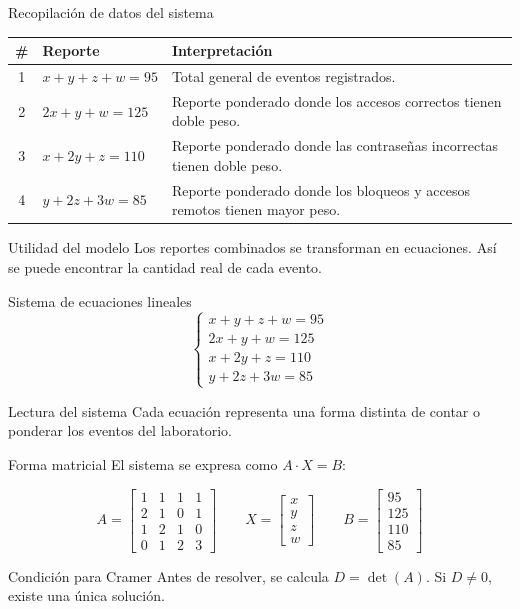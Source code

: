 \documentclass[aspectratio=169]{beamer}
\newcommand{\mat}[1]{\begin{bmatrix}#1\end{bmatrix}}
\begin{document}
\begin{frame}{Recopilación de datos del sistema}
\begin{table}
\centering
\scriptsize
\begin{tabular}{clp{8.7cm}}
\toprule
\# & Reporte & Interpretación \\
\midrule
1 & $x+y+z+w=95$ & Total general de eventos registrados. \\
2 & $2x+y+w=125$ & Reporte ponderado donde los accesos correctos tienen doble peso. \\
3 & $x+2y+z=110$ & Reporte ponderado donde las contraseñas incorrectas tienen doble peso. \\
4 & $y+2z+3w=85$ & Reporte ponderado donde los bloqueos y accesos remotos tienen mayor peso. \\
\bottomrule
\end{tabular}
\end{table}

\begin{block}{Utilidad del modelo}
Los reportes combinados se transforman en ecuaciones. Así se puede encontrar la cantidad real de cada evento.
\end{block}
\end{frame}

\begin{frame}{Sistema de ecuaciones lineales}
\[
\begin{cases}
x+y+z+w=95 \\
2x+y+w=125 \\
x+2y+z=110 \\
y+2z+3w=85
\end{cases}
\]

\begin{block}{Lectura del sistema}
Cada ecuación representa una forma distinta de contar o ponderar los eventos del laboratorio.
\end{block}
\end{frame}

\begin{frame}{Forma matricial}
El sistema se expresa como $A\cdot X=B$:

\[
A=\mat{
1&1&1&1\\
2&1&0&1\\
1&2&1&0\\
0&1&2&3}
\qquad
X=\mat{x\\y\\z\\w}
\qquad
B=\mat{95\\125\\110\\85}
\]

\begin{alertblock}{Condición para Cramer}
Antes de resolver, se calcula $D=\det(A)$. Si $D\neq0$, existe una única solución.
\end{alertblock}
\end{frame}
\end{document}
